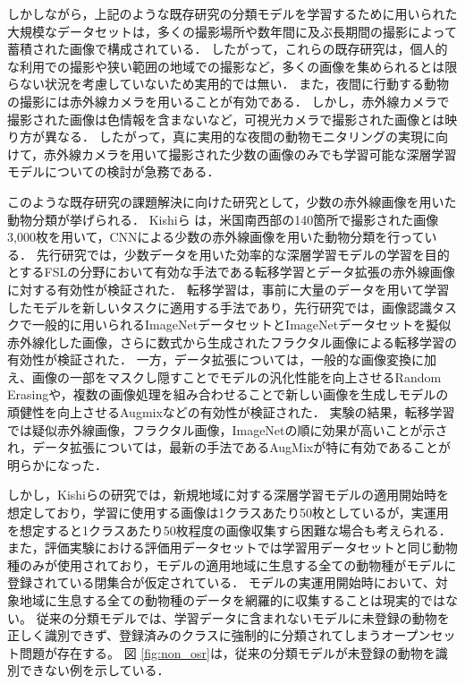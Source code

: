 \documentclass[a4paper,11pt,nomag]{jsreport}
\begin{document}
しかしながら，上記のような既存研究の分類モデルを学習するために用いられた大規模なデータセットは，多くの撮影場所や数年間に及ぶ長期間の撮影によって蓄積された画像で構成されている．
したがって，これらの既存研究は，個人的な利用での撮影や狭い範囲の地域での撮影など，多くの画像を集められるとは限らない状況を考慮していないため実用的では無い．
また，夜間に行動する動物の撮影には赤外線カメラを用いることが有効である．
しかし，赤外線カメラで撮影された画像は色情報を含まないなど，可視光カメラで撮影された画像とは映り方が異なる．
したがって，真に実用的な夜間の動物モニタリングの実現に向けて，赤外線カメラを用いて撮影された少数の画像のみでも学習可能な深層学習モデルについての検討が急務である．

このような既存研究の課題解決に向けた研究として，少数の赤外線画像を用いた動物分類が挙げられる．
Kishiら \cite{kishimoto2023}は，米国南西部の140箇所で撮影された画像3,000枚を用いて，CNNによる少数の赤外線画像を用いた動物分類を行っている．
先行研究では，少数データを用いた効率的な深層学習モデルの学習を目的とするFSLの分野において有効な手法である転移学習とデータ拡張の赤外線画像に対する有効性が検証された．
転移学習は，事前に大量のデータを用いて学習したモデルを新しいタスクに適用する手法であり，先行研究では，画像認識タスクで一般的に用いられるImageNetデータセットとImageNetデータセットを擬似赤外線化した画像，さらに数式から生成されたフラクタル画像による転移学習の有効性が検証された．
一方，データ拡張については，一般的な画像変換に加え、画像の一部をマスクし隠すことでモデルの汎化性能を向上させるRandom Erasingや，複数の画像処理を組み合わせることで新しい画像を生成しモデルの頑健性を向上させるAugmixなどの有効性が検証された．
実験の結果，転移学習では疑似赤外線画像，フラクタル画像，ImageNetの順に効果が高いことが示され，データ拡張については，最新の手法であるAugMixが特に有効であることが明らかになった．

しかし，Kishiらの研究では，新規地域に対する深層学習モデルの適用開始時を想定しており，学習に使用する画像は1クラスあたり50枚としているが，実運用を想定すると1クラスあたり50枚程度の画像収集すら困難な場合も考えられる．
また，評価実験における評価用データセットでは学習用データセットと同じ動物種のみが使用されており，モデルの適用地域に生息する全ての動物種がモデルに登録されている閉集合が仮定されている．
モデルの実運用開始時において、対象地域に生息する全ての動物種のデータを網羅的に収集することは現実的ではない。
従来の分類モデルでは、学習データに含まれないモデルに未登録の動物を正しく識別できず、登録済みのクラスに強制的に分類されてしまうオープンセット問題が存在する。
図 \ref{fig:non_osr}は，従来の分類モデルが未登録の動物を識別できない例を示している．
\end{document}

